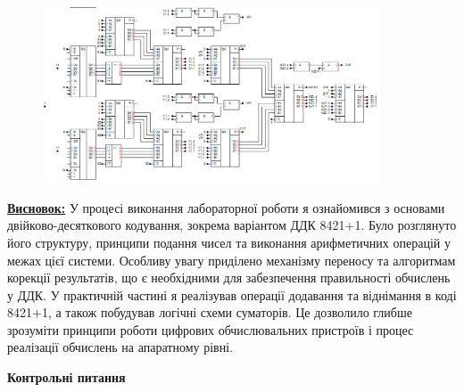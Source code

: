 \documentclass[12pt,a4paper]{article}
\begin{document}
    \begin{figure}[ht]
        \centering
        \includegraphics[width=0.89\textwidth]{3_4.png}
    \end{figure}

    \textbf{\underline{Висновок:}}
    У процесі виконання лабораторної роботи я ознайомився з основами двійково-десяткового кодування, зокрема варіантом ДДК 8421+1. Було розглянуто його структуру, принципи подання чисел та виконання арифметичних операцій у межах цієї системи. Особливу увагу приділено механізму переносу та алгоритмам корекції результатів, що є необхідними для забезпечення правильності обчислень у ДДК.
У практичній частині я реалізував операції додавання та віднімання в коді 8421+1, а також побудував логічні схеми суматорів. Це дозволило глибше зрозуміти принципи роботи цифрових обчислювальних пристроїв і процес реалізації обчислень на апаратному рівні.

    \newpage

    \begin{center} \textbf{\large Контрольні питання} \end{center}

    \vspace{1em}
\end{document}
